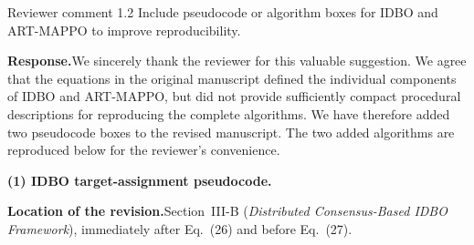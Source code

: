 \documentclass[11pt]{article}
\newcommand{\rsp}{\medskip\noindent\textbf{Response.}\quad}
\newcommand{\loc}{\medskip\noindent\textbf{Location of the revision.}\quad}
\begin{document}
\begin{reviewercomment}{Reviewer comment 1.2}
Include pseudocode or algorithm boxes for IDBO and ART-MAPPO to improve
reproducibility.
\end{reviewercomment}

\rsp We sincerely thank the reviewer for this valuable suggestion. We agree
that the equations in the original manuscript defined the individual
components of IDBO and ART-MAPPO, but did not provide sufficiently compact
procedural descriptions for reproducing the complete algorithms. We have
therefore added two pseudocode boxes to the revised manuscript. The two added algorithms are
reproduced below for the reviewer's convenience.

\medskip
\noindent\textbf{(1) IDBO target-assignment pseudocode.}

\loc Section~III-B (\emph{Distributed Consensus-Based IDBO Framework}),
immediately after Eq.~(26) and before Eq.~(27).
\end{document}

